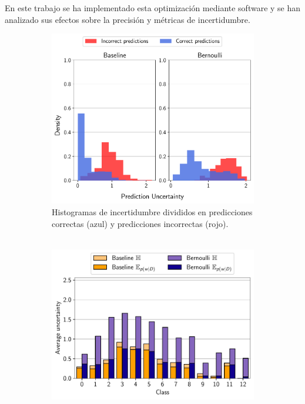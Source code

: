 En este trabajo se ha implementado esta optimización mediante software y se han analizado sus efectos sobre la precisión y métricas de incertidumbre.

\begin{figure}[h]
     \centering
     \begin{subfigure}[b]{0.46\textwidth}
         \centering
         \includegraphics[width=\textwidth]{root/Imagenes/opt_software/bernoulli_hist.pdf}
         \caption{Histogramas de incertidumbre divididos en predicciones correctas (azul) y predicciones incorrectas (rojo).\\ \\}
         \label{fig:bernoulli_hist}
     \end{subfigure}
     \hfill
     \begin{subfigure}[b]{0.51\textwidth}
         \centering
         \includegraphics[width=\textwidth]{root/Imagenes/opt_software/bernoulli_class.pdf}

\end{subfigure}
\end{figure}
